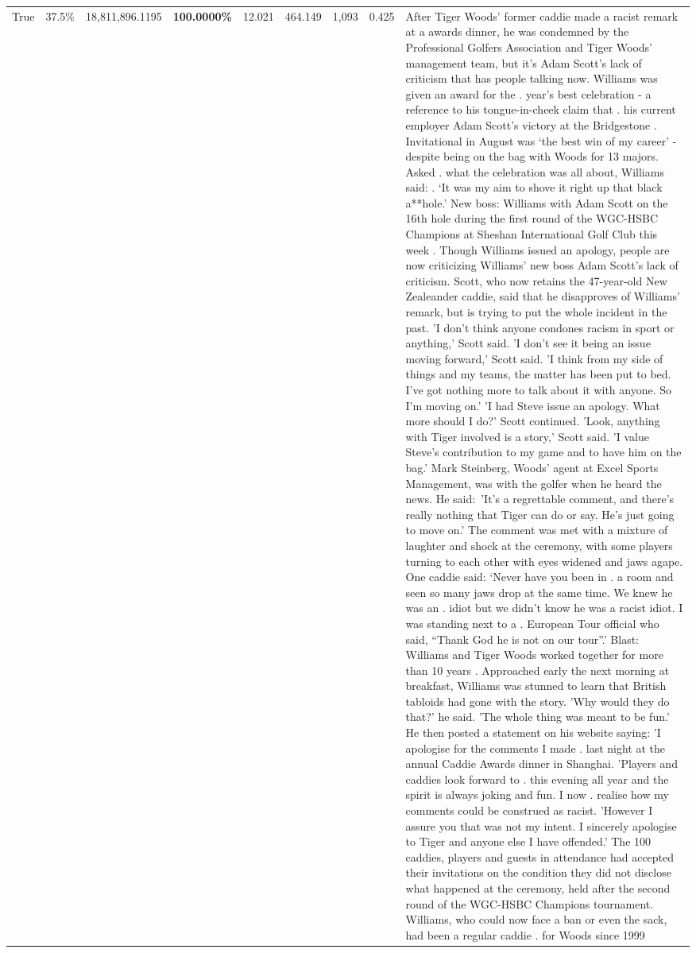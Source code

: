 \begin{table}[H]
\begin{tabular}{lllrlllll}
True & 37.5\% & 18,811,896.1195 & \bfseries \color{red} 100.0000\% & 12.021 & 464.149 & 1,093 & 0.425 & After Tiger Woods' former caddie made a racist remark at a awards dinner, he was condemned by the Professional Golfers Association and Tiger Woods' management team, but it's Adam Scott's lack of criticism that has people talking now. Williams was given an award for the . year’s best celebration - a reference to his tongue-in-cheek claim that . his current employer Adam Scott’s victory at the Bridgestone . Invitational in August was ‘the best win of my career’ - despite being on the bag with Woods for 13 majors. Asked . what the celebration was all about, Williams said: . ‘It was my aim to shove it right up that black a**hole.’ New boss: Williams with Adam Scott  on the 16th hole during the first round of the WGC-HSBC Champions at Sheshan International Golf Club this week . Though Williams issued an apology, people are now criticizing Williams' new boss Adam Scott's lack of criticism. Scott, who now retains the 47-year-old New Zealeander caddie, said that he disapproves of Williams' remark, but is trying to put the whole incident in the past. 'I don't think anyone condones racism in sport or anything,' Scott said. 'I don't see it being an issue moving forward,' Scott said. 'I think from my side of things and my teams, the matter has been put to bed. I've got nothing more to talk about it with anyone. So I'm moving on.' 'I had Steve issue an apology. What more should I do?' Scott continued. 'Look, anything with Tiger involved is a story,' Scott said. 'I value Steve's contribution to my game and to have him on the bag.' Mark Steinberg, Woods' agent at Excel Sports Management, was with the golfer when he heard the news. He said: 'It's a regrettable comment, and there's really nothing that Tiger can do or say. He's just going to move on.' The comment was met with a mixture of laughter and shock at the ceremony, with some players turning to each other with eyes widened and jaws agape. One caddie said: ‘Never have you been in . a room and seen so many jaws drop at the same time. We knew he was an . idiot but we didn’t know he was a racist idiot. I was standing next to a . European Tour official who said, “Thank God he is not on our tour”.’ Blast: Williams and Tiger Woods worked together for more than 10 years . Approached early the next morning at breakfast, Williams was stunned to learn that British tabloids had gone with the story. 'Why would they do that?' he said. 'The whole thing was meant to be fun.' He then posted a statement on his website saying: 'I apologise for the comments I made . last night at the annual Caddie Awards dinner in Shanghai. 'Players and caddies look forward to . this evening all year and the spirit is always joking and fun. I now . realise how my comments could be construed as racist. 'However I assure you that was not my intent. I sincerely apologise to Tiger and anyone else I have offended.' The 100 caddies, players and guests in attendance had accepted their invitations on the condition they did not disclose what happened at the ceremony, held after the second round of the WGC-HSBC Champions tournament. Williams, who could now face a ban or even the sack, had been a regular caddie . for Woods since 1999 
\end{tabular}
\end{table}

